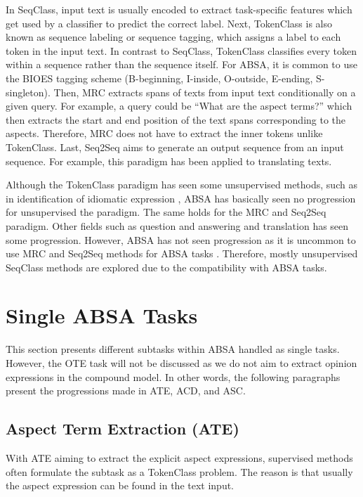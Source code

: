 \documentclass[american, oneside]{ecsgdp}
\begin{document}
In SeqClass, input text is usually encoded to extract task-specific features which get used by a classifier to predict the correct label. Next, TokenClass is also known as sequence labeling or sequence tagging, which assigns a label to each token in the input text. In contrast to SeqClass, TokenClass classifies every token within a sequence rather than the sequence itself. For ABSA, it is common to use the BIOES tagging scheme (B-beginning, I-inside, O-outside, E-ending, S-singleton). Then, MRC extracts spans of texts from input text conditionally on a given query. For example, a query could be ``What are the aspect terms?'' which then extracts the start and end position of the text spans corresponding to the aspects. Therefore, MRC does not have to extract the inner tokens unlike TokenClass. Last, Seq2Seq aims to generate an output sequence from an input sequence. For example, this paradigm has been applied to translating texts.

Although the TokenClass paradigm has seen some unsupervised methods, such as in identification of idiomatic expression \parencite{Fazly2009UnsupervisedTokenClass}, ABSA has basically seen no progression for unsupervised the paradigm. The same holds for the MRC and Seq2Seq paradigm. Other fields such as question and answering \parencite{Cui2020UnsupervisedMRC} and translation \parencite{Ramachandran2017UnsupervisedSeq2Seq} has seen some progression. However, ABSA has not seen progression as it is uncommon to use MRC and Seq2Seq methods for ABSA tasks \parencite{Zhang2022Survey}. Therefore, mostly unsupervised SeqClass methods are explored due to the compatibility with ABSA tasks.

\section{Single ABSA Tasks} \label{sec:single}
This section presents different subtasks within ABSA handled as single tasks. However, the OTE task will not be discussed as we do not aim to extract opinion expressions in the compound model. In other words, the following paragraphs present the progressions made in ATE, ACD, and ASC.

\subsection{Aspect Term Extraction (ATE)} \label{sec:ATE}
With ATE aiming to extract the explicit aspect expressions, supervised methods often formulate the subtask as a TokenClass problem. The reason is that usually the aspect expression can be found in the text input.
\end{document}
